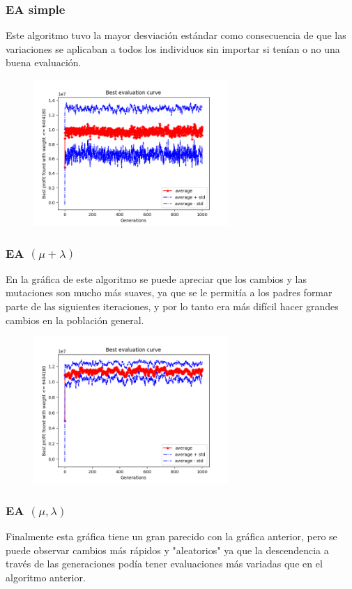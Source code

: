 \documentclass[sigconf,authorversion,nonacm]{acmart}
\begin{document}
\subsubsection{EA simple}
Este algoritmo tuvo la mayor desviación estándar como consecuencia de que las variaciones se aplicaban a todos los individuos sin importar si tenían o no una buena evaluación.

\begin{figure}[H]
  \centering
  \includegraphics[width=210pt]{simple.png}
\end{figure}

\subsubsection{EA $(\mu + \lambda)$}
En la gráfica de este algoritmo se puede apreciar que los cambios y las mutaciones son mucho más suaves, ya que se le permitía a los padres formar parte de las siguientes iteraciones, y por lo tanto era más difícil hacer grandes cambios en la población general.

\begin{figure}[H]
  \centering
  \includegraphics[width=210pt]{plus.png}
\end{figure}

\subsubsection{EA $(\mu , \lambda)$}
Finalmente esta gráfica tiene un gran parecido con la gráfica anterior, pero se puede observar cambios más rápidos y "aleatorios" ya que la descendencia a través de las generaciones podía tener evaluaciones más variadas que en el algoritmo anterior.
\end{document}
